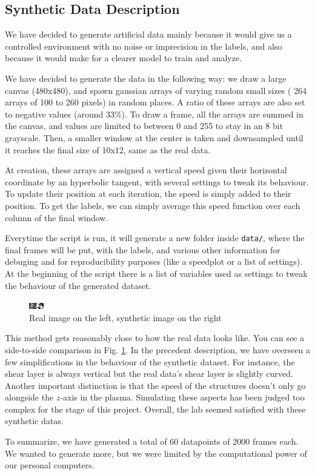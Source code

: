 \documentclass[10pt,conference]{IEEEtran}
\begin{document}
\subsection{Synthetic Data Description}
We have decided to generate artificial data mainly because it would give us a controlled environment with no noise or imprecision in the labels, and also because it would make for a clearer model to train and analyze.\par
We have decided to generate the data in the following way: we draw a large canvas (480x480), and spawn gaussian arrays of varying random small sizes ( 264 arrays of 100 to 260 pixels) in random places. A ratio of these arrays are also set to negative values (around 33\%). To draw a frame, all the arrays are summed in the canvas, and values are limited to between 0 and 255 to stay in an 8 bit grayscale. Then, a smaller window at the center is taken and downsampled until it reaches the final size of 10x12, same as the real data.\par
At creation, these arrays are assigned a vertical speed given their horizontal coordinate by an hyperbolic tangent, with several settings to tweak its behaviour. To update their position at each iteration, the speed is simply added to their position. To get the labels, we can simply average this speed function over each column of the final window.\par
Everytime the script is run, it will generate a new folder inside \texttt{data/}, where the final frames will be put, with the labels, and various other information for debuging and for reproducibility purposes (like a speedplot or a list of settings).
At the beginning of the script there is a list of variables used as settings to tweak the behaviour of the generated dataset.
 
\begin{figure}
  \centering
  \includegraphics[scale=5]{images/comparison.png}
  \caption{Real image on the left, synthetic image on the right}
\label{comparison}
\end{figure}
 
This method gets reasonably close to how the real data looks like. You can see a side-to-side comparison in Fig. \ref{comparison}. In the precedent description, we have overseen a few simplifications in the behaviour of the synthetic dataset. For instance, the shear layer is always vertical but the real data's shear layer is slightly curved. Another important distinction is that the speed of the structures doesn't only go alongside the $z$-axis in the plasma. Simulating these aspects has been judged too complex for the stage of this project. Overall, the lab seemed satisfied with these synthetic datas.\par
To summarize, we have generated a total of 60 datapoints of 2000 frames each. We wanted to generate more, but we were limited by the computational power of our personal computers.
 
\end{document}
